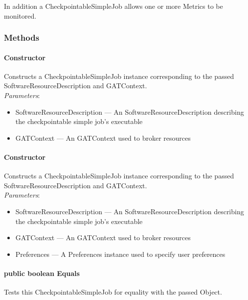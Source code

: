 \documentclass[$Date: 2003/06/26 19:29:31 $]{glabarticle}
\begin{document}
In addition a CheckpointableSimpleJob allows one or more Metrics to be monitored.


\subsubsection{Methods}

\paragraph{Constructor}

Constructs a CheckpointableSimpleJob instance corresponding to the
passed SoftwareResourceDescription and GATContext. \\

\textit{Parameters}:
\begin{itemize}
\item[] SoftwareResourceDescription --- An SoftwareResourceDescription describing the checkpointable 
simple job's executable
\item[] GATContext --- An GATContext used to broker resources
\end{itemize}

\paragraph{Constructor}

Constructs a CheckpointableSimpleJob instance corresponding to the
passed SoftwareResourceDescription and GATContext. \\

\textit{Parameters}:
\begin{itemize}
\item[] SoftwareResourceDescription --- An SoftwareResourceDescription describing the checkpointable 
simple job's executable
\item[] GATContext --- An GATContext used to broker resources
\item[] Preferences --- A Preferences instance used to specify user preferences
\end{itemize}

\paragraph{public boolean Equals}

Tests this CheckpointableSimpleJob for equality with the passed Object. \\
\end{document}
